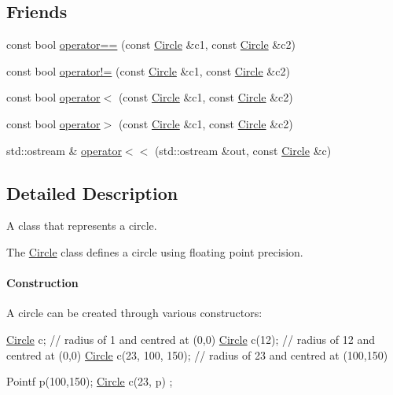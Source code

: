 \subsection*{Friends}
\begin{DoxyCompactItemize}
\item 
const bool \hyperlink{classprism_1_1_circle_aea4bcef75428f13320f5c8148869d7ac}{operator==} (const \hyperlink{classprism_1_1_circle}{Circle} \&c1, const \hyperlink{classprism_1_1_circle}{Circle} \&c2)
\item 
const bool \hyperlink{classprism_1_1_circle_ac1093de6b8dac6c9df82db5b72148634}{operator!=} (const \hyperlink{classprism_1_1_circle}{Circle} \&c1, const \hyperlink{classprism_1_1_circle}{Circle} \&c2)
\item 
const bool \hyperlink{classprism_1_1_circle_a3aaa7d08426b0e4aa5f51f1839eb3bb1}{operator$<$} (const \hyperlink{classprism_1_1_circle}{Circle} \&c1, const \hyperlink{classprism_1_1_circle}{Circle} \&c2)
\item 
const bool \hyperlink{classprism_1_1_circle_a519af3a911c5ccd13d0c711d0adfef79}{operator$>$} (const \hyperlink{classprism_1_1_circle}{Circle} \&c1, const \hyperlink{classprism_1_1_circle}{Circle} \&c2)
\item 
std\+::ostream \& \hyperlink{classprism_1_1_circle_a4deb656103c2fc1ea9258fc37bfdcc6c}{operator$<$$<$} (std\+::ostream \&out, const \hyperlink{classprism_1_1_circle}{Circle} \&c)
\end{DoxyCompactItemize}


\subsection{Detailed Description}
A class that represents a circle. 

The \hyperlink{classprism_1_1_circle}{Circle} class defines a circle using floating point precision.

\paragraph*{Construction}

A circle can be created through various constructors\+:


\begin{DoxyCode}
\hyperlink{classprism_1_1_circle_aff41793f64e90d15a4d89851b1a6b011}{Circle} c; \textcolor{comment}{// radius of 1 and centred at (0,0)}
\hyperlink{classprism_1_1_circle_aff41793f64e90d15a4d89851b1a6b011}{Circle} c(12); \textcolor{comment}{// radius of 12 and centred at (0,0)}
\hyperlink{classprism_1_1_circle_aff41793f64e90d15a4d89851b1a6b011}{Circle} c(23, 100, 150); \textcolor{comment}{// radius of 23 and centred at (100,150)}

Pointf p(100,150);
\hyperlink{classprism_1_1_circle_aff41793f64e90d15a4d89851b1a6b011}{Circle} c(23, p) ;
\end{DoxyCode}


